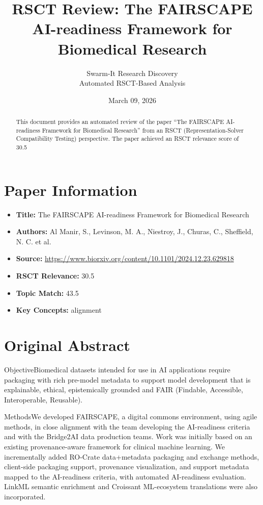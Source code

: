\documentclass[11pt,a4paper]{article}
\title{RSCT Review: The FAIRSCAPE AI-readiness Framework for Biomedical Research}
\author{Swarm-It Research Discovery\\\small Automated RSCT-Based Analysis}
\date{March 09, 2026}
\begin{document}
\maketitle

\begin{abstract}
This document provides an automated review of the paper ``The FAIRSCAPE AI-readiness Framework for Biomedical Research'' from an RSCT (Representation-Solver Compatibility Testing) perspective. The paper achieved an RSCT relevance score of 30.5%
\end{abstract}

\section{Paper Information}
\begin{itemize}
\item \textbf{Title:} The FAIRSCAPE AI-readiness Framework for Biomedical Research
\item \textbf{Authors:} Al Manir, S., Levinson, M. A., Niestroy, J., Churas, C., Sheffield, N. C. et al.
\item \textbf{Source:} \url{https://www.biorxiv.org/content/10.1101/2024.12.23.629818}
\item \textbf{RSCT Relevance:} 30.5%
\item \textbf{Topic Match:} 43.5%
\item \textbf{Key Concepts:} alignment
\end{itemize}

\section{Original Abstract}
ObjectiveBiomedical datasets intended for use in AI applications require packaging with rich pre-model metadata to support model development that is explainable, ethical, epistemically grounded and FAIR (Findable, Accessible, Interoperable, Reusable).

MethodsWe developed FAIRSCAPE, a digital commons environment, using agile methods, in close alignment with the team developing the AI-readiness criteria and with the Bridge2AI data production teams. Work was initially based on an existing provenance-aware framework for clinical machine learning. We incrementally added RO-Crate data+metadata packaging and exchange methods, client-side packaging support, provenance visualization, and support metadata mapped to the AI-readiness criteria, with automated AI-readiness evaluation. LinkML semantic enrichment and Croissant ML-ecosystem translations were also incorporated.
\end{document}
